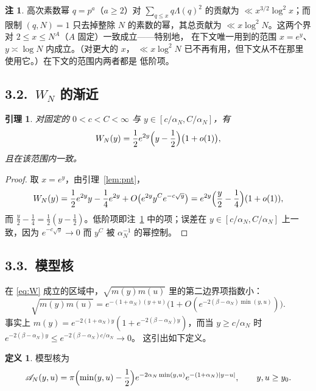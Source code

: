 \documentclass[12pt,a4paper]{amsart}
\numberwithin{equation}{section}
\theoremstyle{plain}
\newtheorem{lemma}[theorem]{引理}
\theoremstyle{definition}
\newtheorem{remark}[theorem]{注}
\newtheorem{definition}[theorem]{定义}
\begin{document}
\begin{remark}\label{rem:primepowers}
高次素数幂 $q=p^a$（$a\ge2$）对 $\sum_{q\le x}q\Lambda(q)^2$ 的贡献为
$\ll x^{3/2}\log^2x$；而限制 $(q,N)=1$ 只去掉整除 $N$ 的素数的幂，其总贡献为
$\ll x\log^2N$。这两个界对 $2\le x\le N^{A}$（$A$ 固定）一致成立——特别地，
在下文唯一用到的范围 $x=e^y$、$y\asymp\log N$ 内成立。（对更大的 $x$，
$\ll x\log^2N$ 已不再有用，但下文从不在那里使用它。）在下文的范围内两者都是
低阶项。
\end{remark}

\subsection*{3.2.\ $W_N$ 的渐近}

\begin{lemma}\label{lem:W}
对固定的 $0<c<C<\infty$ 与 $y\in[c/\alpha_N,C/\alpha_N]$，有
\begin{equation}\label{eq:W}
 W_N(y)=\frac12e^{2y}\Bigl(y-\frac12\Bigr)\bigl(1+o(1)\bigr),
\end{equation}
且在该范围内一致。
\end{lemma}

\begin{proof}
取 $x=e^y$，由引理~\ref{lem:pnt}，
\[
 W_N(y)=\frac12e^{2y}y-\frac14e^{2y}+O\bigl(e^{2y}y^Ce^{-c\sqrt{y}}\bigr)
 =e^{2y}\Bigl(\frac y2-\frac14\Bigr)(1+o(1)),
\]
而 $\frac y2-\frac14=\frac12(y-\frac12)$。低阶项即注~\ref{rem:primepowers}
中的项；误差在 $y\in[c/\alpha_N,C/\alpha_N]$ 上一致，因为
$e^{-c\sqrt{y}}\to0$ 而 $y^C$ 被 $\alpha_N^{-1}$ 的幂控制。
\end{proof}

\subsection*{3.3.\ 模型核}

在 \eqref{eq:W} 成立的区域中，$\sqrt{m(y)m(u)}$ 里的第二边界项指数小：
\begin{equation}\label{eq:second}
 \sqrt{m(y)m(u)}
 =e^{-(1+\alpha_N)(y+u)}
 \bigl(1+O(e^{-2(\beta-\alpha_N)\min(y,u)})\bigr).
\end{equation}
事实上 $m(y)=e^{-2(1+\alpha_N)y}(1+e^{-2(\beta-\alpha_N)y})$，而当
$y\ge c/\alpha_N$ 时 $e^{-2(\beta-\alpha_N)y}\le e^{-2(\beta-\alpha_N)c/\alpha_N}\to0$。
这引出如下定义。

\begin{definition}\label{def:model}
模型核为
\begin{equation}\label{eq:model}
 \mathscr A_N(y,u)=\pi\Bigl(\min(y,u)-\frac12\Bigr)
 e^{-2\alpha_N\min(y,u)}e^{-(1+\alpha_N)|y-u|},
 \qquad y,u\ge y_0 .
\end{equation}
\end{definition}
\end{document}

